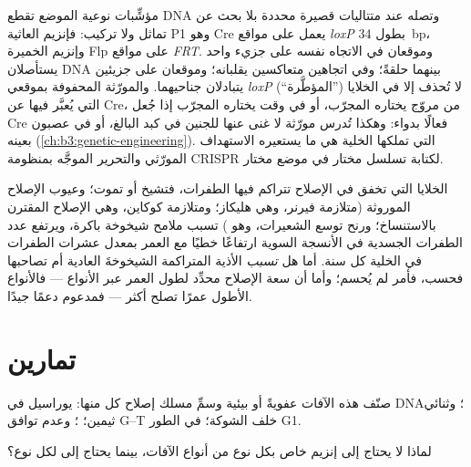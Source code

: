 \begin{proposition}\label{prop:b3:dna-repair:tools}
مؤشِّبات نوعية الموضع تقطع DNA وتصله عند متتاليات قصيرة محددة بلا
بحث عن تماثل ولا تركيب: فإنزيم العاثية P1
وهو Cre يعمل على مواقع \emph{loxP} بطول \qty{34}{bp}، وإنزيم
الخميرة Flp على مواقع \emph{FRT}. وموقعان في الاتجاه نفسه على جزيء
واحد يستأصلان DNA بينهما حلقةً؛ وفي اتجاهين متعاكسين
يقلبانه؛ وموقعان على جزيئين يتبادلان جناحيهما. والمورّثة
المحفوفة بموقعي \emph{loxP} (``المؤطَّرة'') لا تُحذف إلا في الخلايا
التي يُعبَّر فيها عن Cre، من مروّج يختاره المجرّب،
أو في وقت يختاره المجرّب إذا جُعل Cre فعالًا بدواء:
وهكذا تُدرس مورّثة لا غنى عنها للجنين في كبد البالغ،
أو في عصبون بعينه (\cref{ch:b3:genetic-engineering}).  التي تملكها الخلية هي ما يستعيره الاستهداف
المورّثي والتحرير الموجَّه بمنظومة CRISPR لكتابة تسلسل مختار في
موضع مختار.
\end{proposition}

\begin{remark}\label{rem:b3:dna-repair:ageing}
الخلايا التي تخفق في الإصلاح تتراكم فيها الطفرات، فتشيخ أو تموت؛
وعيوب الإصلاح الموروثة (متلازمة فيرنر، وهي هليكاز؛ ومتلازمة
كوكاين، وهي الإصلاح المقترن بالاستنساخ؛ ورنح توسع الشعيرات، وهو )
تسبب ملامح شيخوخة باكرة، ويرتفع عدد الطفرات الجسدية في الأنسجة
السوية ارتفاعًا خطيًا مع العمر بمعدل عشرات الطفرات في الخلية كل
سنة. أما هل \emph{تسبب} الأذية المتراكمة الشيخوخةَ العادية أم
تصاحبها فحسب، فأمر لم يُحسم؛ وأما أن سعة الإصلاح محدِّد لطول العمر
عبر الأنواع --- فالأنواع الأطول عمرًا تصلح أكثر --- فمدعوم دعمًا جيدًا.
\end{remark}

\section{تمارين}

\begin{exercise}[$\star$]\label{exo:b3:dna-repair:1}
صنّف هذه الآفات عفويةً أو بيئية وسمِّ مسلك إصلاح كل منها: يوراسيل في
DNA؛ وثنائي ثيمين؛ ؛ وعدم توافق G--T خلف الشوكة؛  في الطور G1.
\end{exercise}

\begin{exercise}[$\star$]\label{exo:b3:dna-repair:2}
لماذا لا يحتاج  إلى إنزيم خاص بكل نوع من
أنواع الآفات، بينما يحتاج  إلى  لكل
نوع؟
\end{exercise}

